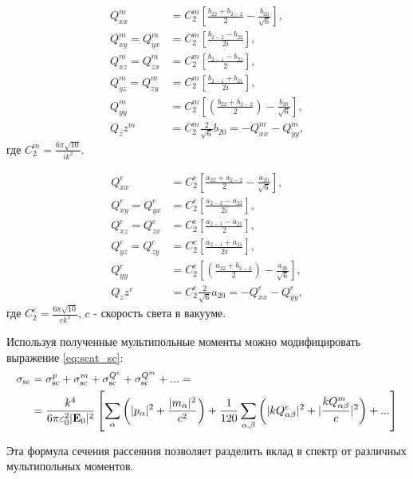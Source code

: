 \begin{align*}
    Q_{xx}^m &= C^m_2 \left[ \frac{b_{22}+b_{2-2}}{2} - \frac{b_{20}}{\sqrt{6}} \right], \\
    Q_{xy}^m = Q_{yx}^m &= C^m_2 \left[ \frac{b_{2-2}-b_{22}}{2 i} \right], \\
    Q_{xz}^m = Q_{zx}^m &= C^m_2 \left[ \frac{b_{2-1}-b_{21}}{2}  \right],\\
    Q_{yz}^m = Q_{zy}^m &= C^m_2 \left[ \frac{b_{2-1}+b_{21}}{2i} \right],\\
    Q_{yy}^m &= C^m_2 \left[ \left( \frac{b_{22}+b_{2-2}}{2} \right)  -\frac{b_{20}}{\sqrt{6}}\right],\\
    Q_zz^m &= C^m_2 \frac{2 }{\sqrt{6}} b_{20} = -Q_{xx}^m -Q_{yy}^m,
\end{align*}
где $C_2^m = \frac{6 \pi \sqrt{10}}{i k^2}$. 

\begin{align*}
    Q_{xx}^e &= C_2^e \left[ \frac{a_{22}+a_{2-2}}{2} - \frac{a_{20}}{\sqrt{6}} \right], \\
    Q_{xy}^e = Q_{yx}^e &= C_2^e \left[ \frac{a_{2-2}-a_{22}}{2 i} \right], \\
    Q_{xz}^e = Q_{zx}^e &= C_2^e \left[ \frac{a_{2-1}-a_{21}}{2}  \right],\\
    Q_{yz}^e = Q_{zy}^e &= C_2^e \left[ \frac{a_{2-1}+a_{21}}{2i} \right],\\
    Q_{yy}^e &= C_2^e \left[ \left( \frac{a_{22}+b_{2-2}}{2} \right)  -\frac{a_{20}}{\sqrt{6}}\right],\\
    Q_zz^e &= C_2^e \frac{2 }{\sqrt{6}} a_{20} = -Q_{xx}^e -Q_{yy}^e,
\end{align*}
где $C_2^e = \frac{6 \pi \sqrt{10}}{c k^2}$, $c$ - скорость света в вакууме. 

Используя полученные мультипольные моменты можно модифицировать выражение \eqref{eq:scat_sc}:
\begin{align*}
    \sigma_{\text{sc}} &= \sigma_{\text{sc}}^p + \sigma_{\text{sc}}^m + \sigma_{\text{sc}}^{Q^e} +
    \sigma_{\text{sc}}^{Q^m} + ... = \\ &= \frac{k^4}{6 \pi \varepsilon_0^2 |\vb{E}_0|^2 } \left[ \sum_{\alpha}\left( |p_{\alpha}|^2 + 
    \frac{| m_{\alpha}|^2}{c^2} \right) + \frac{1}{120} \sum_{\alpha,\beta} \left( |k Q_{\alpha \beta}^e|^2 + |\frac{k Q_{\alpha \beta}^m}{c}|^2 \right) + ...\right]
\end{align*}

Эта формула сечения рассеяния позволяет разделить вклад в спектр от различных мультипольных моментов. 

